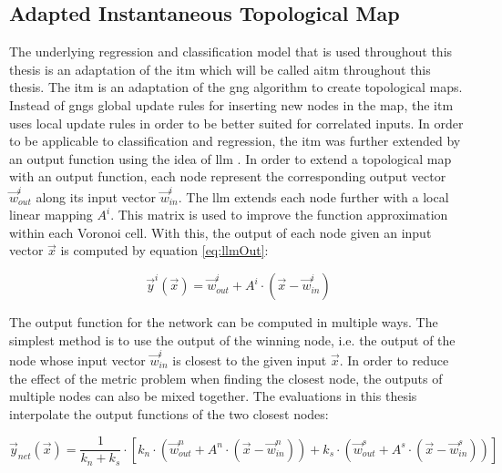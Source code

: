 \subsection{Adapted Instantaneous Topological Map \label{sec:ITM}}
The underlying regression and classification model that is used throughout this thesis is an adaptation of the \acrfull{itm} which will be called \acrfull{aitm} throughout this thesis.
The \gls{itm} \cite{itm} is an adaptation of the \gls{gng} \cite{gng} algorithm to create topological maps. Instead of \glspl{gng} global update rules for inserting new nodes in the map, the \gls{itm} uses local update rules in order to be better suited for correlated inputs. 
In order to be applicable to classification and regression, the \gls{itm} was further extended by an output function using the idea of \gls{llm} \cite{LLM}. In order to extend a topological map with an output function, each node represent the corresponding output vector $\vec{w}^i_{out}$ along its input vector $\vec{w}^i_{in}$. The \gls{llm} extends each node further with a local linear mapping $A^i$. This matrix is used to improve the function approximation within each Voronoi cell. With this, the output of each node given an input vector $\vec{x}$ is computed by equation \ref{eq:llmOut}:

\begin{equation}
\vec{y}^i(\vec{x}) = \vec{w}^i_{out} + A^i \cdot (\vec{x}-\vec{w}^i_{in})
\label{eq:llmOut}
\end{equation}

The output function for the network can be computed in multiple ways. The simplest method is to use the output of the winning node, i.e. the output of the node whose input vector $\vec{w}^i_{in}$ is closest to the given input $\vec{x}$. In order to reduce the effect of the metric problem when finding the closest node, the outputs of multiple nodes can also be mixed together. %
The evaluations in this thesis interpolate the output functions of the two closest nodes:

\begin{equation}
\vec{y}_{net}(\vec{x}) =  \frac{1}{k_n+k_s} \cdot \left[ k_n \cdot \left(\vec{w}^n_{out} + A^n \cdot \left(\vec{x}-\vec{w}^n_{in}\right)\right) + k_s \cdot  \left(\vec{w}^s_{out} + A^s \cdot \left(\vec{x}-\vec{w}^s_{in}\right)\right)\right]
\end{equation}

